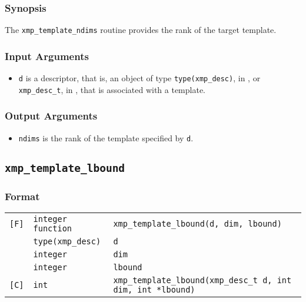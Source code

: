 \subsubsection*{Synopsis}

The {\tt xmp\_template\_ndims} routine provides the rank of the target
template.


\subsubsection*{Input Arguments}
\begin{itemize}
 \item {\tt d} is a descriptor, that is, an object of type 
       {\tt type(xmp\_desc)}, in {\XMPF}, or {\tt xmp\_desc\_t},
       in {\XMPC}, that is associated with a template.
\end{itemize}

\subsubsection*{Output Arguments}
\begin{itemize}
 \item {\tt ndims} is the rank of the template specified by {\tt d}.
\end{itemize}


\subsection{\tt xmp\_template\_lbound}

\subsubsection*{Format}

\begin{tabular}{lll}

\verb![F]!& {\tt integer function}& {\tt xmp\_template\_lbound(d, dim, lbound)}\\
          & {\tt type(xmp\_desc)} & {\tt d}\\
          & {\tt integer} & {\tt dim}\\
          & {\tt integer} & {\tt lbound}\\

\verb![C]!&  {\tt int}& {\tt xmp\_template\_lbound(xmp\_desc\_t d, int dim, int *lbound)}\\

\end{tabular}

